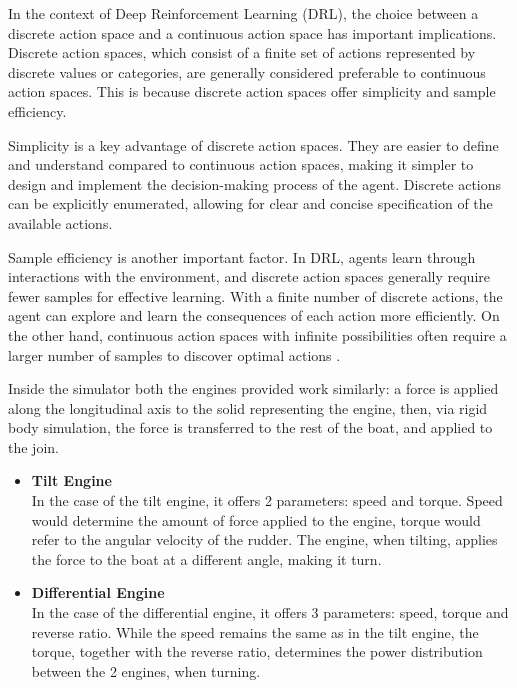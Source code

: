 \begin{textblock}
In the context of Deep Reinforcement Learning (DRL), the choice between a discrete action space and a continuous action space has important implications. Discrete action spaces, which consist of a finite set of actions represented by discrete values or categories, are generally considered preferable to continuous action spaces. This is because discrete action spaces offer simplicity and sample efficiency.

Simplicity is a key advantage of discrete action spaces. They are easier to define and understand compared to continuous action spaces, making it simpler to design and implement the decision-making process of the agent. Discrete actions can be explicitly enumerated, allowing for clear and concise specification of the available actions.

Sample efficiency is another important factor. In DRL, agents learn through interactions with the environment, and discrete action spaces generally require fewer samples for effective learning. With a finite number of discrete actions, the agent can explore and learn the consequences of each action more efficiently. On the other hand, continuous action spaces with infinite possibilities often require a larger number of samples to discover optimal actions \cite{zhu2022}.

Inside the simulator both the engines provided work similarly: a force is applied along the longitudinal axis to the solid representing the engine, then, via rigid body simulation, the force is transferred to the rest of the boat, and applied to the join. 
\end{textblock}

\begin{itemize}

\item {\bf Tilt Engine }\\
In the case of the tilt engine, it offers 2 parameters: speed and torque. Speed would determine the amount of force applied to the engine, torque would refer to the angular velocity of the rudder. The engine, when tilting, applies the force to the boat at a different angle, making it turn.

\item {\bf Differential Engine }\\
In the case of the differential engine, it offers 3 parameters: speed, torque and reverse ratio. While the speed remains the same as in the tilt engine, the torque, together with the reverse ratio, determines the power distribution between the 2 engines, when turning.

\end{itemize}


